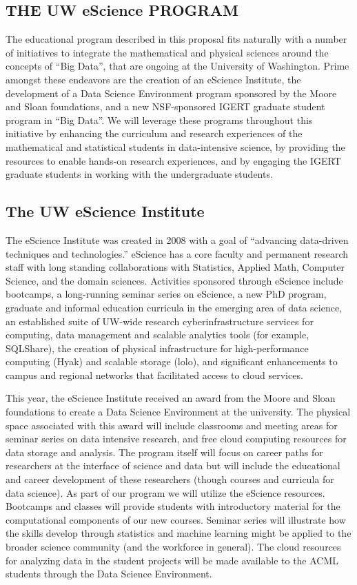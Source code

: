 \subsection{THE UW eScience PROGRAM}
The educational program described in this proposal fits naturally with a number of initiatives to integrate the mathematical and physical sciences around the concepts of ``Big Data'', that are ongoing at the University of Washington. Prime amongst these endeavors are the creation of an eScience Institute, the development of a Data Science Environment program sponsored by the Moore and Sloan foundations, and a new NSF-sponsored IGERT graduate student program in ``Big Data''. We will leverage these programs throughout this initiative by enhancing the curriculum and research experiences of the mathematical and statistical students in data-intensive science, by providing the resources to enable hands-on research experiences, and by engaging the IGERT graduate students in working with the undergraduate students.

\subsection{The UW eScience Institute}

The eScience Institute was created in 2008 with a goal of “advancing data-driven techniques and technologies.” eScience has a core faculty and permanent research staff with long standing collaborations with Statistics, Applied Math, Computer Science, and the domain sciences. Activities sponsored through eScience include bootcamps, a long-running seminar series on eScience, a new PhD program, graduate and informal education curricula in the emerging area of data science, an established suite of UW-wide research cyberinfrastructure services for computing, data management and scalable analytics tools (for example, SQLShare), the creation of physical infrastructure for high-performance computing (Hyak) and scalable storage (lolo), and significant enhancements to campus and regional networks that facilitated access to cloud services.

This year, the eScience Institute received an award from the Moore and Sloan foundations to create a Data Science Environment at the university. The physical space associated with this award will include classrooms and meeting areas for seminar series on data intensive research, and free cloud computing resources for data storage and analysis. The program itself will focus on career paths for researchers at the interface of science and data but will include the educational and career development of these researchers (though courses and curricula for data science). As part of our program we will utilize the eScience resources.
 Bootcamps and classes will provide students with introductory material for the computational components of our new courses. Seminar series will illustrate how the skills develop through statistics and machine learning might be applied to the broader science community (and the workforce in general). The cloud resources for analyzing data in the student projects will be made available to the ACML students through the Data Science Environment.

